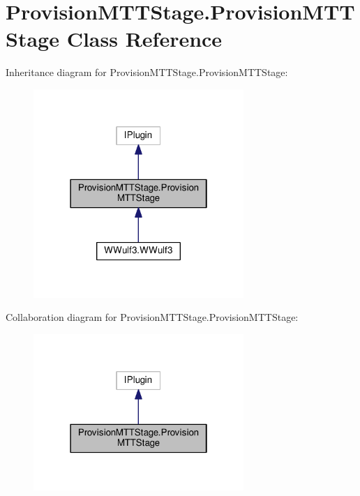 \hypertarget{classProvisionMTTStage_1_1ProvisionMTTStage}{\section{Provision\-M\-T\-T\-Stage.\-Provision\-M\-T\-T\-Stage Class Reference}
\label{classProvisionMTTStage_1_1ProvisionMTTStage}
}


Inheritance diagram for Provision\-M\-T\-T\-Stage.\-Provision\-M\-T\-T\-Stage\-:
\nopagebreak
\begin{figure}[H]
\begin{center}
\leavevmode
\includegraphics[width=226pt]{classProvisionMTTStage_1_1ProvisionMTTStage__inherit__graph}
\end{center}
\end{figure}


Collaboration diagram for Provision\-M\-T\-T\-Stage.\-Provision\-M\-T\-T\-Stage\-:
\nopagebreak
\begin{figure}[H]
\begin{center}
\leavevmode
\includegraphics[width=226pt]{classProvisionMTTStage_1_1ProvisionMTTStage__coll__graph}
\end{center}
\end{figure}
